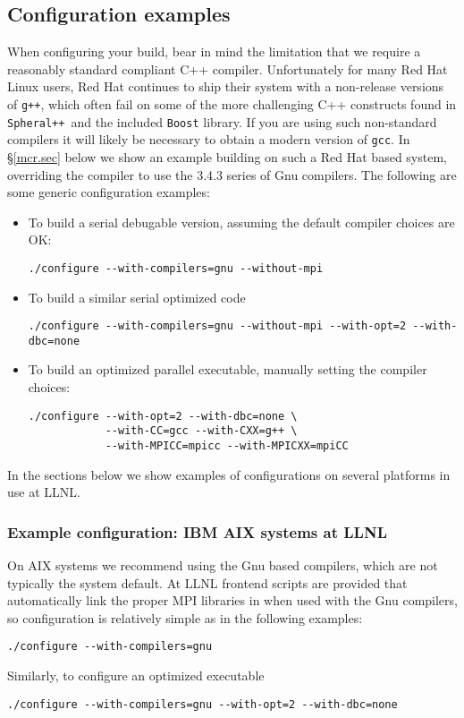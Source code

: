 \documentclass{article}
\newcommand{\Spheral}{{\tt Spheral++}}
\begin{document}
\subsection{Configuration examples}

When configuring your build, bear in mind the limitation that we require a
reasonably standard compliant C++ compiler.  Unfortunately for many Red Hat
Linux users, Red Hat continues to ship their system with a non-release versions
of \verb.g++., which often fail on some of the more challenging C++ constructs
found in \Spheral\ and the included {\tt Boost} library.  If you are using such
non-standard compilers it will likely be necessary to obtain a modern version of
\verb+gcc+.  In \S \ref{mcr.sec} below we show an example building on such a Red
Hat based system, overriding the compiler to use the 3.4.3 series of Gnu
compilers.  The following are some generic configuration examples:

\begin{itemize}
\item To build a serial debugable version, assuming the default compiler choices
are OK:
\begin{verbatim}
./configure --with-compilers=gnu --without-mpi
\end{verbatim}

\item To build a similar serial optimized code
\begin{verbatim}
./configure --with-compilers=gnu --without-mpi --with-opt=2 --with-dbc=none
\end{verbatim}

\item To build an optimized parallel executable, manually setting the compiler
choices:
\begin{verbatim}
./configure --with-opt=2 --with-dbc=none \
            --with-CC=gcc --with-CXX=g++ \
            --with-MPICC=mpicc --with-MPICXX=mpiCC
\end{verbatim}

\end{itemize}

In the sections below we show examples of configurations on several platforms in
use at LLNL.

\subsubsection{Example configuration: IBM AIX systems at LLNL}
\label{berg.sec}
On AIX systems we recommend using the Gnu based compilers, which are not
typically the system default.  At LLNL frontend scripts are provided that
automatically link the proper MPI libraries in when used with the Gnu
compilers, so configuration is relatively simple as in the following examples:
\begin{verbatim}
./configure --with-compilers=gnu
\end{verbatim}
Similarly, to configure an optimized executable
\begin{verbatim}
./configure --with-compilers=gnu --with-opt=2 --with-dbc=none
\end{verbatim}
\end{document}
